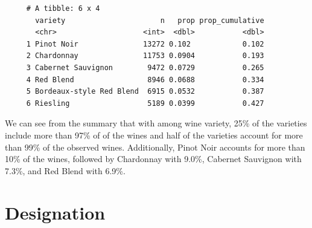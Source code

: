\documentclass[12pt,twoside]{amherstthesis}
\begin{document}
\begin{verbatim}
     # A tibble: 6 x 4
       variety                      n   prop prop_cumulative
       <chr>                    <int>  <dbl>           <dbl>
     1 Pinot Noir               13272 0.102            0.102
     2 Chardonnay               11753 0.0904           0.193
     3 Cabernet Sauvignon        9472 0.0729           0.265
     4 Red Blend                 8946 0.0688           0.334
     5 Bordeaux-style Red Blend  6915 0.0532           0.387
     6 Riesling                  5189 0.0399           0.427
\end{verbatim}
We can see from the summary that with among wine variety, 25\% of the
varieties include more than 97\% of of the wines and half of the
varieties account for more than 99\% of the observed wines.
Additionally, Pinot Noir accounts for more than 10\% of the wines,
followed by Chardonnay with 9.0\%, Cabernet Sauvignon with 7.3\%, and
Red Blend with 6.9\%.

\section{Designation}\label{designation}
\end{document}
